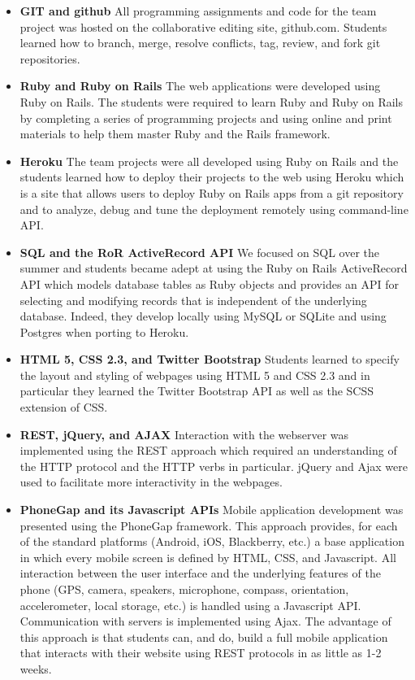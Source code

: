 \documentclass{sig-alternate}
\begin{document}
\begin{itemize}
\item {\bf GIT and github} All programming assignments and code for the team project was hosted on the collaborative editing site, github.com.  Students learned how to branch, merge, resolve conflicts, tag, review, and fork git repositories.
\item {\bf Ruby and Ruby on Rails} The web applications were developed using Ruby on Rails. The students were required to learn Ruby and Ruby on Rails by completing a series of programming projects and using online and print materials to help them master Ruby and the Rails framework.
\item {\bf Heroku} The team projects were all developed using Ruby on Rails and the students learned how to deploy their projects to the web using Heroku which is a site that allows users to deploy Ruby on Rails apps from a git repository and to analyze, debug and tune the deployment remotely using command-line API.
\item {\bf SQL and the RoR ActiveRecord API} We focused on SQL over the summer and students became adept at using the Ruby on Rails ActiveRecord API which models database tables as Ruby objects and provides an API for selecting and modifying records that is independent of the underlying database.  Indeed, they develop locally using MySQL or SQLite and using Postgres when porting to Heroku.
\item {\bf HTML 5, CSS 2.3,  and Twitter Bootstrap} Students learned to specify the layout and styling of webpages using HTML 5 and CSS 2.3 and in particular they learned the Twitter Bootstrap API as well as the SCSS extension of CSS.  
\item {\bf REST, jQuery, and AJAX} Interaction with the webserver was implemented using the REST approach which required an understanding of the HTTP protocol and the HTTP verbs in particular.  jQuery and Ajax were used to facilitate more interactivity in the webpages.
\item {\bf PhoneGap and its Javascript APIs} Mobile application development was presented using the PhoneGap framework.  This approach provides, for each of the standard platforms (Android, iOS, Blackberry, etc.) a base application in which every mobile screen is defined by HTML, CSS, and Javascript.  All interaction between the user interface and the underlying features of the phone (GPS, camera, speakers, microphone, compass, orientation, accelerometer, local storage, etc.) is handled using a Javascript API.  Communication with servers is implemented using Ajax.  The advantage of this approach is that students can, and do, build a full mobile application that interacts with their website using REST protocols in as little as 1-2 weeks.


\end{itemize}
\end{document}
